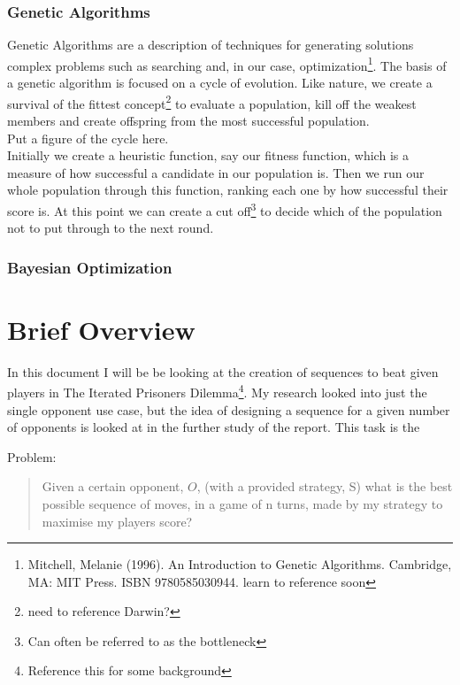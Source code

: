 \subsubsection{Genetic Algorithms}
Genetic Algorithms are a description of techniques for generating solutions complex problems such as searching and, in our case, optimization\footnote{Mitchell, Melanie (1996). An Introduction to Genetic Algorithms. Cambridge, MA: MIT Press. ISBN 9780585030944. learn to reference soon}. The basis of a genetic algorithm is focused on a cycle of evolution. Like nature, we create a survival of the fittest concept\footnote{need to reference Darwin?} to evaluate a population, kill off the weakest members and create offspring from the most successful population.\\

Put a figure of the cycle here.\label{fig:genetic algo cycle} \\

Initially we create a heuristic function, say our fitness function, which is a measure of how successful a candidate in our population is. Then we run our whole population through this function, ranking each one by how successful their score is. At this point we can create a cut off\footnote{Can often be referred to as the bottleneck} to decide which of the population not to put through to the next round.\\
\subsubsection{Bayesian Optimization}

\section{Brief Overview}
In this document I will be be looking at the creation of sequences to beat given players in The Iterated Prisoners Dilemma\footnote{Reference this for some background}. My research looked into just the single opponent use case, but the idea of designing a sequence for a given number of opponents is looked at in the further study of the report. This task is the


Problem:\\
\begin{quotation}
    Given a certain opponent, \(O\), (with a provided strategy, S) what is the best possible sequence of moves, in a game of n turns, made by my strategy to maximise my players score?
\end{quotation}

